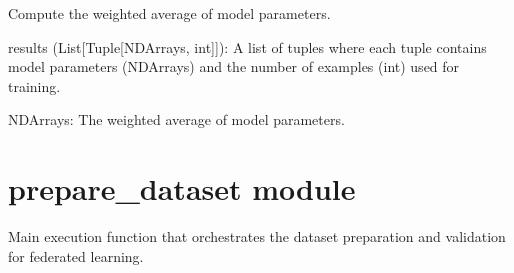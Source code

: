 \documentclass[letterpaper,10pt,english]{sphinxmanual}
\begin{document}

\begin{fulllineitems}
\label{\detokenize{insur_maskedAgg:insur_maskedAgg.aggregate_weighted_average}}
\pysigstartsignatures
{}
\pysigstopsignatures
\sphinxAtStartPar
Compute the weighted average of model parameters.
\begin{description}
\sphinxAtStartPar
results (List{[}Tuple{[}NDArrays, int{]}{]}): A list of tuples where each tuple contains model parameters (NDArrays) and the number of examples (int) used for training.

\sphinxAtStartPar
NDArrays: The weighted average of model parameters.

\end{description}

\end{fulllineitems}


\sphinxstepscope


\section{prepare\_dataset module}
\label{\detokenize{prepare_dataset:module-prepare_dataset}}\label{\detokenize{prepare_dataset:prepare-dataset-module}}\label{\detokenize{prepare_dataset::doc}}

\begin{fulllineitems}
\label{\detokenize{prepare_dataset:prepare_dataset.main}}
\pysigstartsignatures
{}
\pysigstopsignatures
\sphinxAtStartPar
Main execution function that orchestrates the dataset preparation and validation for federated learning.

\end{fulllineitems}
\end{document}

